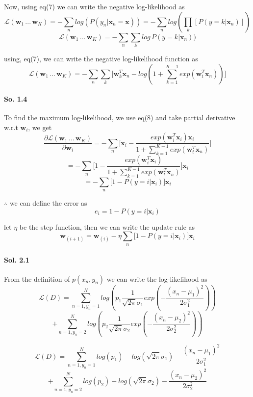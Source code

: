 \documentclass[]{report}
\begin{document}
		Now, using eq(7) we can write the negative log-likelihood as 
		\[ \mathcal{L}(\textbf{w}_1\,...\,\textbf{w}_K) = - \sum_n log(P(y_n | \textbf{x}_n = \textbf{x})) = - \sum_n log( \prod_k [P(y = k | \textbf{x}_n)]) \]
		\[ \mathcal{L}(\textbf{w}_1\,...\,\textbf{w}_K) = - \sum_n \sum_k log\, P(y = k | \textbf{x}_n)) \]

		using, eq(7), we can write the negative log-likelihood function as
		\begin{equation}
			 \mathcal{L}(\textbf{w}_1\,...\,\textbf{w}_K) = - \sum_n \sum_k \big[ \textbf{w}_k^T \textbf{x}_n - log(1 + \sum_{k=1}^{K-1} exp(\textbf{w}_t^T \textbf{x}_n )) \big]
		\end{equation}
		
	\paragraph{So. 1.4}
		To find the maximum log-likelihood, we use eq(8) and take partial derivative w.r.t $\textbf{w}_i$, we get
		\[ \frac{\partial{\mathcal{L}(\textbf{w}_1\,...\,\textbf{w}_K)}}{\partial{\textbf{w}_i}} = - \sum_n \big[ \textbf{x}_i - \frac{exp(\textbf{w}_i^T \textbf{x}_i)\textbf{x}_i}{ 1 + \sum_{k=1}^{K-1} exp(\textbf{w}_t^T \textbf{x}_n )} \big] \]	
		\[ = - \sum_n \big[ 1 - \frac{exp(\textbf{w}_i^T \textbf{x}_i)}{ 1 + \sum_{k=1}^{K-1} exp(\textbf{w}_t^T \textbf{x}_n)} \big] \textbf{x}_i \]
		\[ = - \sum_n \big[ 1 - P(y = i| \textbf{x}_i) \big] \textbf{x}_i \]

		$\therefore$ we can define the error as
		\[ e_i = 1 - P(y = i | \textbf{x}_i )\]

		let $\eta$ be the step function, then we can write the update rule as 
		\[ \textbf{w}_{(i + 1)} = \textbf{w}_{(i)} - \eta \sum_n \big[ 1 - P(y = i| \textbf{x}_i) \big] \textbf{x}_i \]



	\paragraph{Sol. 2.1}
		From the definition of $p(x_n, y_n)$ we can write the log-likelihood as 
		\[ \mathcal{L}(D) =  \sum_{n=1, y_n = 1}^N log(p_1 \frac{1}{\sqrt{2\pi}\sigma_1} exp(- \frac{(x_n - \mu_1)^2}{2\sigma_1^2}))\] \[ + \sum_{n=1, y_n = 2}^N log(p_2 \frac{1}{\sqrt{2\pi}\sigma_2} exp(- \frac{(x_n - \mu_2)^2}{2\sigma_2^2}))\]

		\[ \mathcal{L}(D) = \sum_{n=1, y_n = 1}^N log(p_1) - log(\sqrt{2\pi}\sigma_1) - \frac{(x_n - \mu_1)^2}{2\sigma_1^2} \]
		\[ + \sum_{n=1, y_n = 2}^N log(p_2) - log(\sqrt{2\pi}\sigma_2) - \frac{(x_n - \mu_2)^2}{2\sigma_2^2} \]
\end{document}

